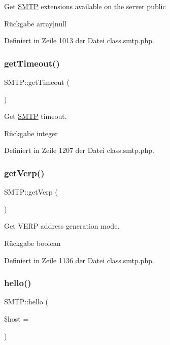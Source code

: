 Get \mbox{\hyperlink{class_s_m_t_p}{S\+M\+TP}} extensions available on the server  public \begin{DoxyReturn}{Rückgabe}
array$\vert$null 
\end{DoxyReturn}


Definiert in Zeile 1013 der Datei class.\+smtp.\+php.

\mbox{\label{class_s_m_t_p_ae17f9c997dd105baa3301fcdcc66fc8a}} 
\subsubsection{\texorpdfstring{get\+Timeout()}{getTimeout()}}
{\footnotesize\ttfamily S\+M\+T\+P\+::get\+Timeout (\begin{DoxyParamCaption}{ }\end{DoxyParamCaption})}

Get \mbox{\hyperlink{class_s_m_t_p}{S\+M\+TP}} timeout. \begin{DoxyReturn}{Rückgabe}
integer 
\end{DoxyReturn}


Definiert in Zeile 1207 der Datei class.\+smtp.\+php.

\mbox{\label{class_s_m_t_p_a3793e37459c62d9b9aecfd9259609cee}} 
\subsubsection{\texorpdfstring{get\+Verp()}{getVerp()}}
{\footnotesize\ttfamily S\+M\+T\+P\+::get\+Verp (\begin{DoxyParamCaption}{ }\end{DoxyParamCaption})}

Get V\+E\+RP address generation mode. \begin{DoxyReturn}{Rückgabe}
boolean 
\end{DoxyReturn}


Definiert in Zeile 1136 der Datei class.\+smtp.\+php.

\mbox{\label{class_s_m_t_p_af1bb1a12327aa53955758265a10f5d05}} 
\subsubsection{\texorpdfstring{hello()}{hello()}}
{\footnotesize\ttfamily S\+M\+T\+P\+::hello (\begin{DoxyParamCaption}\item[{}]{\$host = {\ttfamily \textquotesingle{}\textquotesingle{}} }\end{DoxyParamCaption})}


